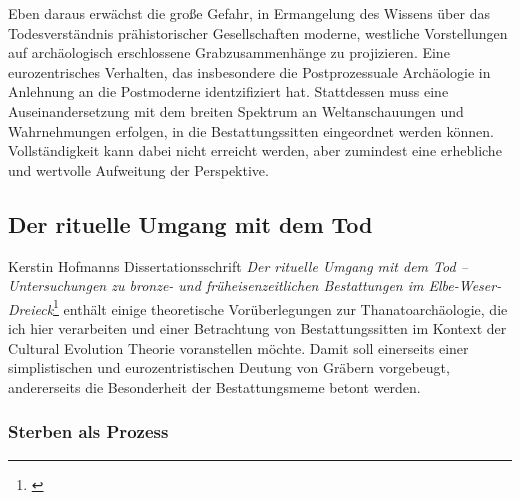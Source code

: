 \documentclass[openany,twoside,twocolumn]{book}
\let\rmarkdownfootnote\footnote%
\def\footnote{\protect\rmarkdownfootnote}
\begin{document}
Eben daraus erwächst die große Gefahr, in Ermangelung des Wissens über
das Todesverständnis prähistorischer Gesellschaften moderne, westliche
Vorstellungen auf archäologisch erschlossene Grabzusammenhänge zu
projizieren. Eine eurozentrisches Verhalten, das insbesondere die
Postprozessuale Archäologie in Anlehnung an die Postmoderne
identzifiziert hat. Stattdessen muss eine Auseinandersetzung mit dem
breiten Spektrum an Weltanschauungen und Wahrnehmungen erfolgen, in die
Bestattungssitten eingeordnet werden können. Vollständigkeit kann dabei
nicht erreicht werden, aber zumindest eine erhebliche und wertvolle
Aufweitung der Perspektive.

\hypertarget{der-rituelle-umgang-mit-dem-tod}{%
\subsection{Der rituelle Umgang mit dem
Tod}\label{der-rituelle-umgang-mit-dem-tod}}

Kerstin Hofmanns Dissertationsschrift \emph{Der rituelle Umgang mit dem
Tod -- Untersuchungen zu bronze- und früheisenzeitlichen Bestattungen im
Elbe-Weser-Dreieck}\footnote{\textcite{hofmann_rituelle_2008}} enthält
einige theoretische Vorüberlegungen zur Thanatoarchäologie, die ich hier
verarbeiten und einer Betrachtung von Bestattungssitten im Kontext der
Cultural Evolution Theorie voranstellen möchte. Damit soll einerseits
einer simplistischen und eurozentristischen Deutung von Gräbern
vorgebeugt, andererseits die Besonderheit der Bestattungsmeme betont
werden.

\hypertarget{sterben-als-prozess}{%
\subsubsection{Sterben als Prozess}\label{sterben-als-prozess}}
\end{document}
